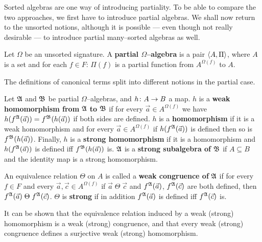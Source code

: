 Sorted algebras are one way of introducing partiality. To be able
to compare the two approaches, we first have to introduce partial
algebras. We shall now return to the unsorted notions, although it
is possible --- even though not really desirable --- to introduce
partial many--sorted algebras as well.
\begin{defn}
Let $\Omega$ be an unsorted signature. A \textbf{partial
$\Omega$--algebra} is a pair $\langle A, \Pi\rangle$, where $A$ is a set
and for each $f \in F$: $\Pi(f)$ is a partial function from
$A^{\Omega(f)}$ to $A$.
\end{defn}
The definitions of canonical terms split into different notions in
the partial case.
\begin{defn}
Let $\mathfrak{A}$ and $\mathfrak{B}$ be partial $\Omega$--algebras, and $h \colon A \rightarrow
B$ a map. $h$ is a 
\textbf{weak homomorphism from} $\mathfrak{A}$ \textbf{to} $\mathfrak{B}$
if for every $\vec{a} \in A^{\Omega(f)}$ we have $h(f^{\mathfrak{A}}(\vec{a})) =
f^{\mathfrak{B}}(h(\vec{a}))$ if both sides are defined. $h$ is a 
\textbf{homomorphism} if it is a weak homomorphism and for every
$\vec{a}\in A^{\Omega(f)}$ if $h(f^{\mathfrak{A}}(\vec{a}))$ is defined
then so is $f^{\mathfrak{B}}(h(\vec{a}))$. Finally, $h$ is a
\textbf{strong homomorphism} if it is a homomorphism and
$h(f^{\mathfrak{A}}(\vec{a}))$ is defined iff $f^{\mathfrak{B}}(h(\vec{a}))$ is. 
$\mathfrak{A}$ is a 
\textbf{strong subalgebra of} $\mathfrak{B}$ if $A \subseteq B$ 
and the identity map is a strong homomorphism.
\end{defn}
\begin{defn}
\label{defn:pcongruence}
An equivalence relation $\Theta$ on $A$ is called a 
\textbf{weak congruence of} $\mathfrak{A}$ if for every $f \in F$ and every 
$\vec{a}, \vec{c} \in A^{\Omega(f)}$ if $\vec{a}\; \Theta\; \vec{c}$ 
and $f^{\mathfrak{A}}(\vec{a})$, $f^{\mathfrak{A}}(\vec{c})$ are both
defined, then $f^{\mathfrak{A}}(\vec{a})\; \Theta\; f^{\mathfrak{A}}(\vec{c})$.
$\Theta$ is 
\textbf{strong} if in addition $f^{\mathfrak{A}}(\vec{a})$
is defined iff $f^{\mathfrak{A}}(\vec{c})$ is.
\end{defn}
It can be shown that the equivalence relation induced by a weak (strong)
homomorphism is a weak (strong) congruence, and that every weak (strong)
congruence defines a surjective weak (strong) homomorphism.


